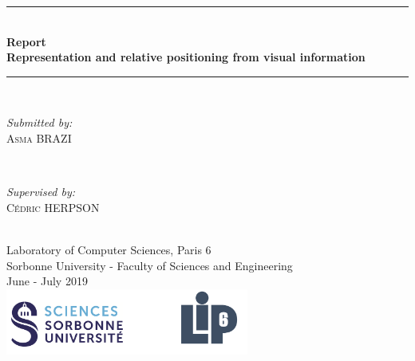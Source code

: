 \documentclass[12pt]{report}
\begin{document}
	\begin{titlepage}
		
		\newcommand{\HRule}{\rule{\linewidth}{0.5mm}} %
		
		\center 
		\HRule \\[0.4cm]
		{ \huge \bfseries Report \\Representation and relative positioning from visual information}\\[0.4cm]
		\HRule \\[1.5cm]
		
		\begin{minipage}{0.4\textwidth}
			\begin{flushleft} \large
				\emph{Submitted by:}\\
				\textsc{Asma BRAZI}
			\end{flushleft}
		\end{minipage}
		~
		\begin{minipage}{0.4\textwidth}
			\begin{flushright} \large
				\emph{Supervised by:} \\
				\textsc{Cédric HERPSON}\\
			\end{flushright}
		\end{minipage}\\[4cm]
		
		
		{\large Laboratory of Computer Sciences, Paris 6 \\ Sorbonne University - Faculty of Sciences and Engineering}\\[3cm] 
		{\large June - July 2019 }\\[3cm] 
		\includegraphics[width=0.6\textwidth]{res/logo.png}\\[1cm] 
		\vfill %
		
	\end{titlepage}
	
\end{document}
